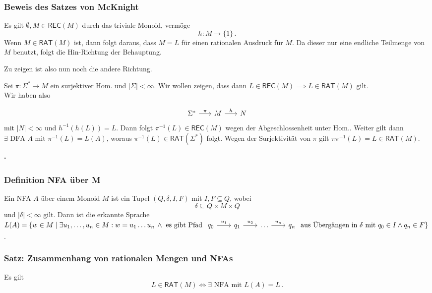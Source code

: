 \documentclass[12pt, german]{article}
\newcommand{\sigstern}{\Sigma^\ast}
\newcommand{\inv}{^{-1}}
\newcommand{\rat}{\mathsf{RAT}}
\newcommand{\rec}{\mathsf{REC}}
\newcommand{\bewiesen}{
	
	\begin{flushright}
		$\square$  \\
\end{flushright}}
\begin{document}
	\subsubsection{Beweis des Satzes von McKnight}
	Es gilt $\emptyset, M \in \rec(M)$ durch das triviale Monoid, vermöge $$h: M \to \{1\}\, .$$ Wenn $M \in \rat(M)$ ist, dann folgt daraus, dass $M=L$ für einen rationalen Ausdruck für $M$. 
	Da dieser nur eine endliche Teilmenge von $M$ benutzt, folgt die Hin-Richtung der Behauptung.
	
	Zu zeigen ist also nun noch die andere Richtung. 
	\newline
	
	Sei $\pi : \sigstern \to M$ ein surjektiver Hom. und $|\Sigma| < \infty$. 
	Wir wollen zeigen, dass dann $L \in \rec(M) \implies L \in \rat(M)$ gilt.\\
	Wir haben also
	
	\begin{equation*}
		\begin{tikzcd}[column sep=1.5pc]
			\sigstern \arrow{r}{\pi} & M \arrow{r}{h} & N 
		\end{tikzcd}
	\end{equation*}
	mit $|N| < \infty$ und $h\inv(h(L)) = L$. Dann folgt $\pi\inv(L) \in \rec(M)$ wegen der Abgeschlossenheit unter Hom..
	Weiter gilt dann $\exists \text{ DFA } A \text{ mit } \pi\inv(L) = L(A)$, woraus $\pi\inv(L) \in \rat(\Sigma^*)$ folgt.
	Wegen der Surjektivität von $\pi$ gilt $\pi\pi\inv(L) = L \in \rat(M)$.
	\bewiesen
	
	\subsubsection{Definition NFA über M}
	Ein NFA $A$ über einem Monoid $M$ ist ein Tupel $(Q, \delta, I, F)$ mit $I, F \subseteq Q$, wobei $$\delta \subseteq Q \times M \times Q$$ und $|\delta| < \infty$ gilt. 
	Dann ist die erkannte Sprache $L(A) = \{w \in M \mid \exists u_1, \ldots, u_n \in M : w = u_1 \ldots u_n \, \wedge \text{ es gibt Pfad } \begin{tikzcd}[column sep=1.7pc]
		q_0\arrow{r}{u_1} &  q_1 \arrow{r}{u_2} & \ldots \arrow{r}{u_n} & q_n
	\end{tikzcd} \text{ aus Übergängen in } \delta \text{ mit } q_0 \in I \wedge q_n \in F\}$. 

	
	\subsubsection{Satz: Zusammenhang von rationalen Mengen und NFAs}
	Es gilt $$ L \in \rat(M) \iff \exists \text{ NFA mit } L(A) = L \, .$$
	
\end{document}
